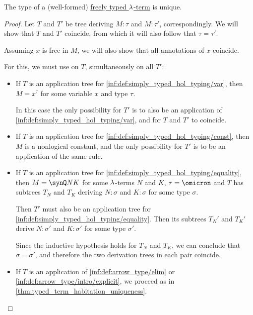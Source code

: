 \begin{proposition}\label{thm:simply_typed_hol_type_uniqueness}
  The type of a (well-formed) \hyperref[def:freely_typed_lambda_term]{freely typed \( {\mathrm \lambda} \)-term} is unique.
\end{proposition}
\begin{proof}
  Let \( T \) and \( T' \) be tree deriving \( M: \tau \) and \( M: \tau' \), correspondingly. We will show that \( T \) and \( T' \) coincide, from which it will also follow that \( \tau = \tau' \).

  Assuming \( x \) is free in \( M \), we will also show that all annotations of \( x \) coincide.

  For this, we must use  on \( T \), simultaneously on all \( T' \):
  \begin{itemize}
    \item If \( T \) is an application tree for \ref{inf:def:simply_typed_hol_typing/var}, then \( M = x^\tau \) for some variable \( x \) and type \( \tau \).

    In this case the only possibility for \( T' \) is to also be an application of \ref{inf:def:simply_typed_hol_typing/var}, and for \( T \) and \( T' \) to coincide.

    \item If \( T \) is an application tree for \ref{inf:def:simply_typed_hol_typing/const}, then \( M \) is a nonlogical constant, and the only possibility for \( T' \) is to be an application of the same rule.

    \item If \( T \) is an application tree for \ref{inf:def:simply_typed_hol_typing/equality}, then \( M = \synQ N K \) for some \( {\mathrm \lambda} \)-terms \( N \) and \( K \), \( \tau = \omicron \) and \( T \) has subtrees \( T_N \) and \( T_K \) deriving \( N: \sigma \) and \( K: \sigma \) for some type \( \sigma \).

    Then \( T' \) must also be an application tree for \ref{inf:def:simply_typed_hol_typing/equality}. Then its subtrees \( T_N' \) and \( T_K' \) derive \( N: \sigma' \) and \( K: \sigma' \) for some type \( \sigma' \).

    Since the inductive hypothesis holds for \( T_N \) and \( T_K \), we can conclude that \( \sigma = \sigma' \), and therefore the two derivation trees in each pair coincide.

    \item If \( T \) is an application of \ref{inf:def:arrow_type/elim} or \ref{inf:def:arrow_type/intro/explicit}, we proceed as in \cref{thm:typed_term_habitation_uniqueness}.
  \end{itemize}
\end{proof}

